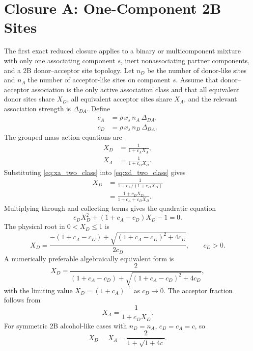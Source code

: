 \documentclass[12pt,letterpaper]{article}
\begin{document}
\section{Closure A: One-Component 2B Sites}
\label{sec:closure-a}

The first exact reduced closure applies to a binary or multicomponent mixture
with only one associating component \(s\), inert nonassociating partner
components, and a 2B donor--acceptor site topology. Let \(n_D\) be the number of
donor-like sites and \(n_A\) the number of acceptor-like sites on component
\(s\). Assume that donor--acceptor association is the only active association
class and that all equivalent donor sites share \(X_D\), all equivalent acceptor
sites share \(X_A\), and the relevant association strength is
\(\Delta_{DA}\). Define
\begin{align}
  c_A &= \rho\,x_s\,n_A\,\Delta_{DA}, \label{eq:c_a}\\
  c_D &= \rho\,x_s\,n_D\,\Delta_{DA}. \label{eq:c_d}
\end{align}
The grouped mass-action equations are
\begin{align}
  X_D &= \frac{1}{1+c_A X_A}, \label{eq:xd_two_class}\\
  X_A &= \frac{1}{1+c_D X_D}. \label{eq:xa_two_class}
\end{align}
Substituting \eqref{eq:xa_two_class} into \eqref{eq:xd_two_class} gives
\begin{align}
  X_D
  &=
  \frac{1}{
    1 + c_A/(1+c_D X_D)
  } \nonumber\\
  &=
  \frac{1+c_D X_D}{1+c_A+c_D X_D}. \label{eq:xd_substitution}
\end{align}
Multiplying through and collecting terms gives the quadratic equation
\begin{equation}
  c_D X_D^2 + (1+c_A-c_D)X_D - 1 = 0.
  \label{eq:xd_quadratic}
\end{equation}
The physical root in \(0<X_D\le 1\) is
\begin{equation}
  X_D =
  \frac{-(1+c_A-c_D)
  + \sqrt{(1+c_A-c_D)^2+4c_D}}
  {2c_D},
  \qquad c_D>0.
  \label{eq:xd_root_direct}
\end{equation}
A numerically preferable algebraically equivalent form is
\begin{equation}
  X_D =
  \frac{2}{
    (1+c_A-c_D)+\sqrt{(1+c_A-c_D)^2+4c_D}
  },
  \label{eq:xd_root_stable}
\end{equation}
with the limiting value \(X_D=(1+c_A)^{-1}\) as \(c_D\to 0\). The acceptor
fraction follows from
\begin{equation}
  X_A = \frac{1}{1+c_D X_D}.
  \label{eq:xa_from_xd}
\end{equation}
For symmetric 2B alcohol-like cases with \(n_D=n_A\), \(c_D=c_A=c\), so
\begin{equation}
  X_D=X_A=\frac{2}{1+\sqrt{1+4c}}.
  \label{eq:symmetric_2b_root}
\end{equation}
\end{document}
